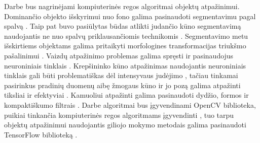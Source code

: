 \documentclass{VUMIFPSbakalaurinis}
\begin{document}
Darbe bus nagrinėjami kompiuterinės regos algoritmai objektų atpažinimui. Dominančio objekto išskyrimui nuo fono galima pasinaudoti segmentavimu pagal spalvą \cite{VERHES_LAHI_2005} \cite{SzeliskiCompVision}. Taip pat buvo pasiūlytas būdas atlikti judančio kūno segmentavimą naudojantis ne nuo spalvų priklausančiomis technikomis \cite{4717823}. Segmentavimo metu išskirtiems objektams galima pritaikyti morfologines transformacijas triukšmo pašalinimui \cite{4767941}. Vaizdų atpažinimo problemas galima spręsti ir pasinaudojus neuroniniais tinklais \cite{KhanConvVision}. Krepšininko kūno atpažinimas naudojantis neuroniniais tinklais gali būti problematiškas dėl intensyvaus judėjimo \cite{THOMAS20173}, tačiau tinkamai pasirinkus pradinių duomenų aibę žmogaus kūno ir jo pozą galima atpažinti tiksliai ir efektyviai \cite{Chen_2018_CVPR}. Kamuoliui atpažinti galima pasinaudoti dydžio, formos ir kompaktiškumo filtrais \cite{6224370}. Darbe algoritmai bus įgyvendinami OpenCV biblioteka, puikiai tinkančia kompiuterinės regos algoritmams įgyvendinti \cite{BradskiOpenCV}, tuo tarpu objektų atpažinimui naudojantis giliojo mokymo metodais galima pasinaudoti TensorFlow biblioteką \cite{ShanDeepVision} \cite{HuaMachineLearning}.

\printbibliography[heading=bibintoc]  %
\end{document}
